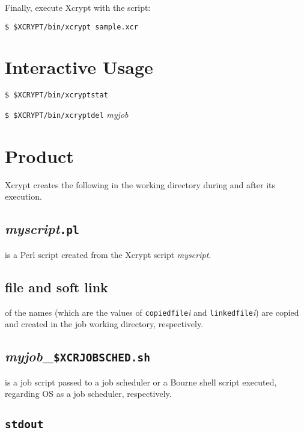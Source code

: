 \documentclass[a4paper,10pt]{report}
\begin{document}
Finally, execute Xcrypt with the script:
\begin{screen}
\texttt{\$ \$XCRYPT/bin/xcrypt sample.xcr}
\end{screen}

\section{Interactive Usage}

\begin{screen}
\texttt{\$ \$XCRYPT/bin/xcryptstat}
\end{screen}
\begin{screen}
\texttt{\$ \$XCRYPT/bin/xcryptdel} \textit{myjob}
\end{screen}

\section{Product}\label{sec:created}

Xcrypt creates the following in the working directory
during and after its execution.

\subsection*{\textit{myscript}\texttt{.pl}}

is a Perl script created from the Xcrypt script \textit{myscript}.

\subsection*{file and soft link}

of the names (which are the values of \texttt{copiedfile}\textit{i}
and \texttt{linkedfile}\textit{i}) are copied and created in the job
working directory, respectively.
\fi

\subsection*{\textit{myjob}\_\texttt{\$XCRJOBSCHED.sh}}

is a job script passed to a job scheduler or a Bourne shell script
executed, regarding OS as a job scheduler, respectively.

\subsection*{\texttt{stdout}}
\end{document}

